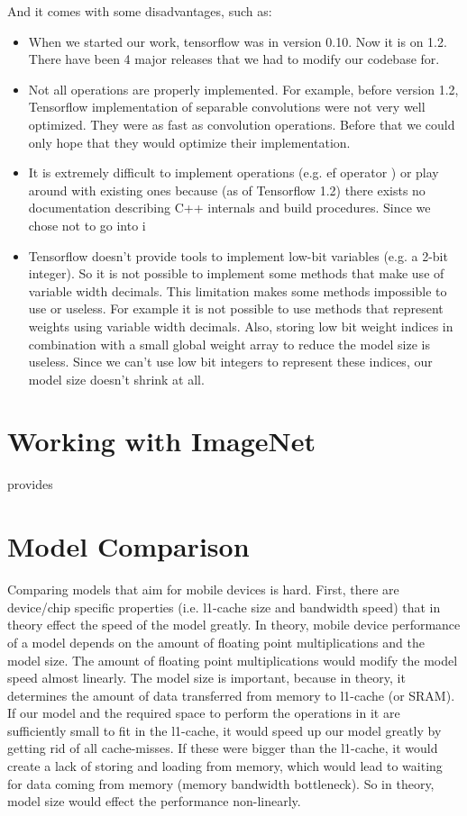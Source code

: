 And it comes with some disadvantages, such as:

\begin{itemize}
\item When we started our work, tensorflow was in version 0.10. Now it is on 1.2. There have been 4 major releases that we had to modify our codebase for.
\item Not all operations are properly implemented. For example, before version 1.2, Tensorflow implementation of separable convolutions were not very well optimized. They were as fast as convolution operations. Before that we could only hope that they would optimize their implementation.
\item It is extremely difficult to implement operations (e.g. ef operator \cite{afrasiyabi2017energy}) or play around with existing ones because (as of Tensorflow 1.2) there exists no documentation describing C++ internals and build procedures. Since we chose not to go into i
\item Tensorflow doesn't provide tools to implement low-bit variables (e.g. a 2-bit integer). So it is not possible to implement some methods that make use of variable width decimals. This limitation makes some methods impossible to use or useless. For example it is not possible to use methods that represent weights using variable width decimals. Also, storing low bit weight indices in combination with a small global weight array to reduce the model size is useless. Since we can't use low bit integers to represent these indices, our model size doesn't shrink at all.
\end{itemize}

\section{Working with ImageNet}
\cite{howard2017mobilenets} provides 

\section{Model Comparison}
Comparing models that aim for mobile devices is hard. First, there are device/chip specific properties (i.e. l1-cache size and bandwidth speed) that in theory effect the speed of the model greatly. In theory, mobile device performance of a model depends on the amount of floating point multiplications and the model size. The amount of floating point multiplications would modify the model speed almost linearly. The model size is important, because in theory, it determines the amount of data transferred from memory to l1-cache (or SRAM). If our model and the required space to perform the operations in it are sufficiently small to fit in the l1-cache, it would speed up our model greatly by getting rid of all cache-misses. If these were bigger than the l1-cache, it would create a lack of storing and loading from memory, which would lead to waiting for data coming from memory (memory bandwidth bottleneck). So in theory, model size would effect the performance non-linearly. 

